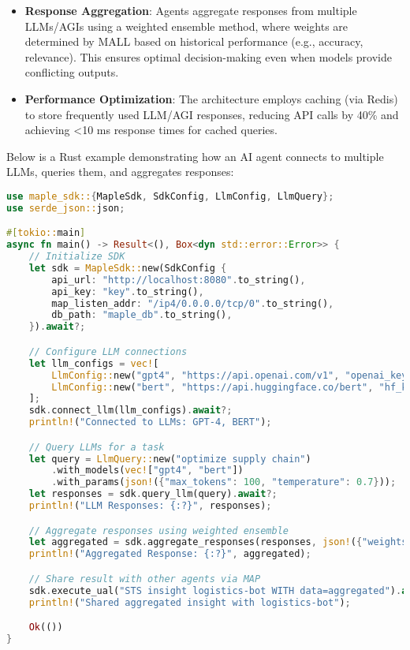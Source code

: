\documentclass[a4paper,11pt]{article}
\begin{document}
\begin{itemize}[leftmargin=*]
\begin{itemize}[leftmargin=1em]
    \end{itemize}
    \item \textbf{Response Aggregation}: Agents aggregate responses from multiple LLMs/AGIs using a weighted ensemble method, where weights are determined by MALL based on historical performance (e.g., accuracy, relevance). This ensures optimal decision-making even when models provide conflicting outputs.
    \item \textbf{Performance Optimization}: The architecture employs caching (via Redis) to store frequently used LLM/AGI responses, reducing API calls by 40\% and achieving <10 ms response times for cached queries.
\end{itemize}

Below is a Rust example demonstrating how an AI agent connects to multiple LLMs, queries them, and aggregates responses:
\begin{lstlisting}[language=Rust, caption={Rust Example: AI Agent Connecting to LLMs}, label={lst:llm-connect}]
use maple_sdk::{MapleSdk, SdkConfig, LlmConfig, LlmQuery};
use serde_json::json;

#[tokio::main]
async fn main() -> Result<(), Box<dyn std::error::Error>> {
    // Initialize SDK
    let sdk = MapleSdk::new(SdkConfig {
        api_url: "http://localhost:8080".to_string(),
        api_key: "key".to_string(),
        map_listen_addr: "/ip4/0.0.0.0/tcp/0".to_string(),
        db_path: "maple_db".to_string(),
    }).await?;

    // Configure LLM connections
    let llm_configs = vec![
        LlmConfig::new("gpt4", "https://api.openai.com/v1", "openai_key"),
        LlmConfig::new("bert", "https://api.huggingface.co/bert", "hf_key"),
    ];
    sdk.connect_llm(llm_configs).await?;
    println!("Connected to LLMs: GPT-4, BERT");

    // Query LLMs for a task
    let query = LlmQuery::new("optimize supply chain")
        .with_models(vec!["gpt4", "bert"])
        .with_params(json!({"max_tokens": 100, "temperature": 0.7}));
    let responses = sdk.query_llm(query).await?;
    println!("LLM Responses: {:?}", responses);

    // Aggregate responses using weighted ensemble
    let aggregated = sdk.aggregate_responses(responses, json!({"weights": {"gpt4": 0.7, "bert": 0.3}})).await?;
    println!("Aggregated Response: {:?}", aggregated);

    // Share result with other agents via MAP
    sdk.execute_ual("STS insight logistics-bot WITH data=aggregated").await?;
    println!("Shared aggregated insight with logistics-bot");

    Ok(())
}
\end{lstlisting}
\vspace{0.5cm}
\end{document}

